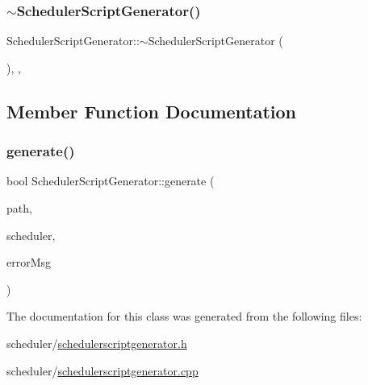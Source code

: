 \mbox{\label{class_scheduler_script_generator_af33a4fc8890bd645aa8dda533959af5b}} 
\subsubsection{\texorpdfstring{$\sim$SchedulerScriptGenerator()}{~SchedulerScriptGenerator()}}
{\footnotesize\ttfamily Scheduler\+Script\+Generator\+::$\sim$\+Scheduler\+Script\+Generator (\begin{DoxyParamCaption}{ }\end{DoxyParamCaption})\hspace{0.3cm}{\ttfamily [virtual]}, {\ttfamily [default]}, {\ttfamily [noexcept]}}



\subsection{Member Function Documentation}
\mbox{\label{class_scheduler_script_generator_ab5924c8eeff404d22858378c8ba6c52c}} 
\subsubsection{\texorpdfstring{generate()}{generate()}}
{\footnotesize\ttfamily bool Scheduler\+Script\+Generator\+::generate (\begin{DoxyParamCaption}\item[{Q\+String}]{path,  }\item[{\mbox{\hyperlink{class_scheduler_job}{Scheduler\+Job}} $\ast$}]{scheduler,  }\item[{Q\+String $\ast$}]{error\+Msg }\end{DoxyParamCaption})\hspace{0.3cm}{\ttfamily [virtual]}}



The documentation for this class was generated from the following files\+:\begin{DoxyCompactItemize}
\item 
scheduler/\mbox{\hyperlink{schedulerscriptgenerator_8h}{schedulerscriptgenerator.\+h}}\item 
scheduler/\mbox{\hyperlink{schedulerscriptgenerator_8cpp}{schedulerscriptgenerator.\+cpp}}\end{DoxyCompactItemize}
